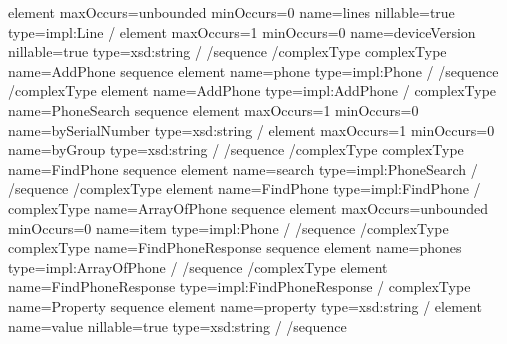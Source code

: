 \documentclass[letterpaper,10pt,english]{sphinxmanual}
\begin{document}
\begin{sphinxVerbatim}[commandchars=\\\{\}]
\PYGZlt{}element maxOccurs=\PYGZdq{}unbounded\PYGZdq{} minOccurs=\PYGZdq{}0\PYGZdq{} name=\PYGZdq{}lines\PYGZdq{} nillable=\PYGZdq{}true\PYGZdq{} type=\PYGZdq{}impl:Line\PYGZdq{} /\PYGZgt{}
\PYGZlt{}element maxOccurs=\PYGZdq{}1\PYGZdq{} minOccurs=\PYGZdq{}0\PYGZdq{} name=\PYGZdq{}deviceVersion\PYGZdq{} nillable=\PYGZdq{}true\PYGZdq{} type=\PYGZdq{}xsd:string\PYGZdq{} /\PYGZgt{}
\PYGZlt{}/sequence\PYGZgt{}
\PYGZlt{}/complexType\PYGZgt{}
\PYGZlt{}complexType name=\PYGZdq{}AddPhone\PYGZdq{}\PYGZgt{}
\PYGZlt{}sequence\PYGZgt{}
\PYGZlt{}element name=\PYGZdq{}phone\PYGZdq{} type=\PYGZdq{}impl:Phone\PYGZdq{} /\PYGZgt{}
\PYGZlt{}/sequence\PYGZgt{}
\PYGZlt{}/complexType\PYGZgt{}
\PYGZlt{}element name=\PYGZdq{}AddPhone\PYGZdq{} type=\PYGZdq{}impl:AddPhone\PYGZdq{} /\PYGZgt{}
\PYGZlt{}complexType name=\PYGZdq{}PhoneSearch\PYGZdq{}\PYGZgt{}
\PYGZlt{}sequence\PYGZgt{}
\PYGZlt{}element maxOccurs=\PYGZdq{}1\PYGZdq{} minOccurs=\PYGZdq{}0\PYGZdq{} name=\PYGZdq{}bySerialNumber\PYGZdq{} type=\PYGZdq{}xsd:string\PYGZdq{} /\PYGZgt{}
\PYGZlt{}element maxOccurs=\PYGZdq{}1\PYGZdq{} minOccurs=\PYGZdq{}0\PYGZdq{} name=\PYGZdq{}byGroup\PYGZdq{} type=\PYGZdq{}xsd:string\PYGZdq{} /\PYGZgt{}
\PYGZlt{}/sequence\PYGZgt{}
\PYGZlt{}/complexType\PYGZgt{}
\PYGZlt{}complexType name=\PYGZdq{}FindPhone\PYGZdq{}\PYGZgt{}
\PYGZlt{}sequence\PYGZgt{}
\PYGZlt{}element name=\PYGZdq{}search\PYGZdq{} type=\PYGZdq{}impl:PhoneSearch\PYGZdq{} /\PYGZgt{}
\PYGZlt{}/sequence\PYGZgt{}
\PYGZlt{}/complexType\PYGZgt{}
\PYGZlt{}element name=\PYGZdq{}FindPhone\PYGZdq{} type=\PYGZdq{}impl:FindPhone\PYGZdq{} /\PYGZgt{}
\PYGZlt{}complexType name=\PYGZdq{}ArrayOfPhone\PYGZdq{}\PYGZgt{}
\PYGZlt{}sequence\PYGZgt{}
\PYGZlt{}element maxOccurs=\PYGZdq{}unbounded\PYGZdq{} minOccurs=\PYGZdq{}0\PYGZdq{} name=\PYGZdq{}item\PYGZdq{} type=\PYGZdq{}impl:Phone\PYGZdq{} /\PYGZgt{}
\PYGZlt{}/sequence\PYGZgt{}
\PYGZlt{}/complexType\PYGZgt{}
\PYGZlt{}complexType name=\PYGZdq{}FindPhoneResponse\PYGZdq{}\PYGZgt{}
\PYGZlt{}sequence\PYGZgt{}
\PYGZlt{}element name=\PYGZdq{}phones\PYGZdq{} type=\PYGZdq{}impl:ArrayOfPhone\PYGZdq{} /\PYGZgt{}
\PYGZlt{}/sequence\PYGZgt{}
\PYGZlt{}/complexType\PYGZgt{}
\PYGZlt{}element name=\PYGZdq{}FindPhoneResponse\PYGZdq{} type=\PYGZdq{}impl:FindPhoneResponse\PYGZdq{} /\PYGZgt{}
\PYGZlt{}complexType name=\PYGZdq{}Property\PYGZdq{}\PYGZgt{}
\PYGZlt{}sequence\PYGZgt{}
\PYGZlt{}element name=\PYGZdq{}property\PYGZdq{} type=\PYGZdq{}xsd:string\PYGZdq{} /\PYGZgt{}
\PYGZlt{}element name=\PYGZdq{}value\PYGZdq{} nillable=\PYGZdq{}true\PYGZdq{} type=\PYGZdq{}xsd:string\PYGZdq{} /\PYGZgt{}
\PYGZlt{}/sequence\PYGZgt{}

\end{sphinxVerbatim}
\end{document}
